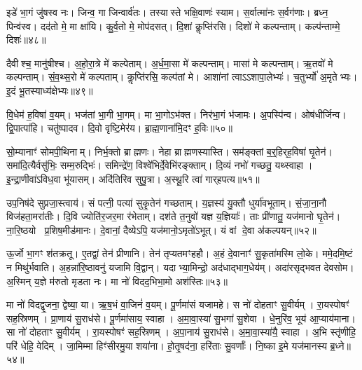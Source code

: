 इडे॑ भा॒गं जु॑षस्व नः।
जिन्व॒ गा जिन्वार्व॑तः।
तस्यास्ते भक्षि॒वाणः॑ स्याम।
स॒र्वात्मा॑नः स॒र्वग॑णाः।
ब्रध्न॒ पिन्व॑स्व।
दद॑तो मे॒ मा क्षा॑यि।
कु॒र्व॒तो मे॒ मोप॑दसत्।
दि॒शां कॢप्ति॑रसि।
दिशो॑ मे कल्पन्ताम्।
कल्प॑न्ताम्मे॒ दिशः॑॥४८॥

दैवीश्च॒ मानु॑षीश्च।
अ॒हो॒रा॒त्रे मे॑ कल्पेताम्।
अ॒र्ध॒मा॒सा मे॑ कल्पन्ताम्।
मासा॑ मे कल्पन्ताम्।
ऋ॒तवो॑ मे कल्पन्ताम्।
सं॒व॒थ्स॒रो मे॑ कल्पताम्।
कॢप्ति॑रसि॒ कल्प॑तां मे।
आशा॑नां त्वा\-ऽऽशापा॒लेभ्यः॑।
च॒तुर्भ्यो॑ अ॒मृतेभ्यः।
इ॒दं भू॒तस्याध्य॑क्षेभ्यः॥४९॥

वि॒धेम॑ ह॒विषा॑ व॒यम्।
भज॑तां भा॒गी भा॒गम्।
मा भा॒गो\-ऽभ॑क्त।
निर॑भा॒गं भ॑जामः।
अ॒पस्पि॑न्व।
ओष॑धीर्जिन्व।
द्वि॒पात्पा॑हि।
चतु॑ष्पादव।
दि॒वो वृष्टि॒मेर॑य।
ब्रा॒ह्म॒णाना॑मि॒दꣳ ह॒विः॥५०॥

सो॒म्यानाꣳ॑ सोमपी॒थिनाम्।
निर्भ॒क्तो ब्राह्मणः।
नेहा ब्राह्मणस्यास्ति।
सम॑ङ्क्तां ब॒र्॒हिर्‌\mbox{}ह॒विषा॑ घृ॒तेन॑।
समा॑दि॒त्यैर्वसु॑भिः॒ सम्म॒रुद्भिः॑।
समिन्द्रे॑ण॒ विश्वे॑भिर्दे॒वेभि॑रङ्क्ताम्।
दि॒व्यं नभो॑ गच्छतु॒ यथ्स्वाहा।
इ॒न्द्रा॒णीवा॑\-ऽविध॒वा भू॑यासम्।
अदि॑तिरिव सुपु॒त्रा।
अ॒स्थू॒रि त्वा॑ गार्‌\mbox{}हपत्य॥५१॥

उप॒निष॑दे सुप्रजा॒स्त्वाय॑।
सं पत्नी॒ पत्या॑ सुकृ॒तेन॑ गच्छताम्।
य॒ज्ञस्य॑ यु॒क्तौ धुर्या॑वभूताम्।
सं॒जा॒ना॒नौ विज॑हता॒मरा॑तीः।
दि॒वि ज्योति॑र॒जर॒मा र॑भेताम्।
दश॑ते त॒नुवो॑ यज्ञ य॒ज्ञियाः᳚।
ताः प्री॑णातु॒ यज॑मानो घृ॒तेन॑।
ना॒रि॒ष्ठयो प्र॒शिष॒मीड॑मानः।
दे॒वानां॒ दैव्येऽपि॒ यज॑मानो॒\-ऽमृतो॑\-ऽभूत्।
यं वां दे॒वा अ॑कल्पयन्॥५२॥

ऊ॒र्जो भा॒गꣳ श॑तक्रतू।
ए॒तद्वां॒ तेन॑ प्रीणानि।
तेन॑ तृप्यतमꣳहहौ।
अ॒हं दे॒वानाꣳ॑ सु॒कृता॑मस्मि लो॒के।
ममे॒दमि॒ष्टं न मिथु॑र्भवाति।
अ॒हन्ना॑रि॒ष्ठावनु॑ यजामि वि॒द्वान्।
यदाभ्या॒मिन्द्रो॒ अद॑धाद्भाग॒धेय॑म्।
अदा॑रसृद्भवत देवसोम।
अ॒स्मिन् य॒ज्ञे म॑रुतो मृडता नः।
मा नो॑ विदद॒भिभा॒मो अश॑स्तिः॥५३॥

मा नो॑ विदद्वृ॒जना॒ द्वेष्या॒ या।
ऋ॒ष॒भं वा॒जिनं॑ व॒यम्।
पू॒र्णमा॑सं यजामहे।
स नो॑ दोहताꣳ सु॒वीर्यम्।
रा॒यस्पोषꣳ॑ सह॒स्रिणम्।
प्रा॒णाय॑ सु॒राध॑से।
पू॒र्णमा॑साय॒ स्वाहा।
अ॒मा॒वा॒स्या॑ सु॒भगा॑ सु॒शेवा।
धे॒नुरि॑व॒ भूय॑ आ॒प्याय॑माना।
सा नो॑ दोहताꣳ सु॒वीर्यम्।
रा॒यस्पोषꣳ॑ सह॒स्रिणम्।
अ॒पा॒नाय॑ सु॒राध॑से।
अ॒मा॒वा॒स्या॑यै॒ स्वाहा।
अ॒भि स्तृ॑णीहि॒ परि॑ धेहि॒ वेदिम्।
जा॒मिम्मा हिꣳ॑सीरमु॒या शया॑ना।
हो॒तृ॒षद॑ना॒ हरि॑ताः सु॒वर्णाः᳚।
नि॒ष्का इ॒मे यज॑मानस्य ब्र॒ध्ने॥५४॥

